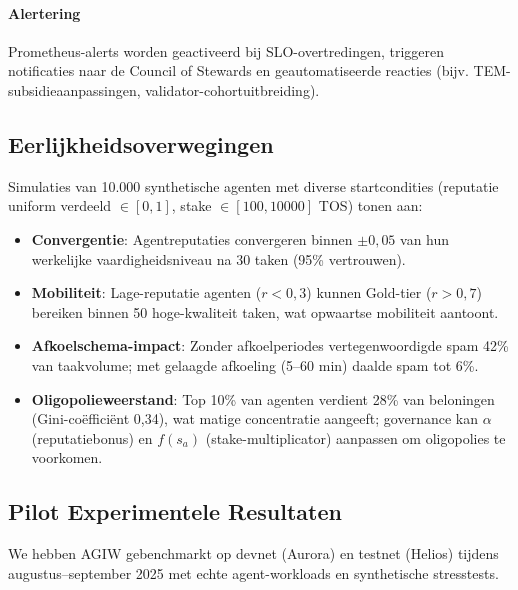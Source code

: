 \documentclass[11pt]{article}
\begin{document}
\paragraph{Alertering} Prometheus-alerts worden geactiveerd bij SLO-overtredingen, triggeren notificaties naar de Council of Stewards en geautomatiseerde reacties (bijv. TEM-subsidieaanpassingen, validator-cohortuitbreiding).

\subsection{Eerlijkheidsoverwegingen}
Simulaties van 10.000 synthetische agenten met diverse startcondities (reputatie uniform verdeeld $\in [0,1]$, stake $\in [100, 10000]$ TOS) tonen aan:
\begin{itemize}[noitemsep]
  \item \textbf{Convergentie}: Agentreputaties convergeren binnen $\pm0,05$ van hun werkelijke vaardigheidsniveau na 30 taken (95\% vertrouwen).
  \item \textbf{Mobiliteit}: Lage-reputatie agenten ($r<0,3$) kunnen Gold-tier ($r>0,7$) bereiken binnen 50 hoge-kwaliteit taken, wat opwaartse mobiliteit aantoont.
  \item \textbf{Afkoelschema-impact}: Zonder afkoelperiodes vertegenwoordigde spam 42\% van taakvolume; met gelaagde afkoeling (5--60 min) daalde spam tot 6\%.
  \item \textbf{Oligopolieweerstand}: Top 10\% van agenten verdient 28\% van beloningen (Gini-coëfficiënt 0,34), wat matige concentratie aangeeft; governance kan $\alpha$ (reputatiebonus) en $f(s_a)$ (stake-multiplicator) aanpassen om oligopolies te voorkomen.
\end{itemize}

\subsection{Pilot Experimentele Resultaten}
\label{sec:pilot-results}
We hebben AGIW gebenchmarkt op devnet (Aurora) en testnet (Helios) tijdens augustus--september 2025 met echte agent-workloads en synthetische stresstests.
\end{document}
